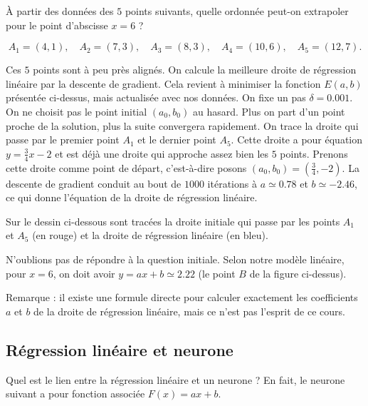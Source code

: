 \documentclass[11pt,class=report,crop=false]{standalone}
\begin{document}
\begin{exemple}
\`A partir des données des $5$ points suivants, quelle ordonnée peut-on extrapoler pour le point d'abscisse $x=6$ ?

$$A_1 = (4,1),\quad A_2 = (7,3),\quad A_3 = (8,3),\quad A_4 = (10,6),\quad A_5 = (12,7).$$

Ces $5$ points sont à peu près alignés. On calcule la meilleure droite de régression linéaire par la descente de gradient. Cela revient à minimiser la fonction $E(a,b)$ présentée ci-dessus, mais actualisée avec nos données. 
On fixe un pas $\delta = 0.001$.
On ne choisit pas le point initial $(a_0,b_0)$ au hasard. Plus on part d'un point proche de la solution, plus la suite convergera rapidement. On trace la droite qui passe par le premier point $A_1$ et le dernier point $A_5$. Cette droite a pour équation $y=\frac34 x -2$ et est déjà une droite qui approche assez bien les $5$ points. Prenons cette droite comme point de départ, c'est-à-dire posons $(a_0,b_0) = (\frac34,-2)$.
La descente de gradient conduit au bout de $1000$ itérations à $a\simeq 0.78$ et $b\simeq -2.46$,
ce qui donne l'équation de la droite de régression linéaire.

Sur le dessin ci-dessous sont tracées la droite initiale qui passe par les points $A_1$ et $A_5$ (en rouge) et la droite de régression linéaire (en bleu).


N'oublions pas de répondre à la question initiale. Selon notre modèle linéaire, pour $x=6$, on doit avoir $y=ax+b \simeq 2.22$ (le point $B$ de la figure ci-dessus).
\end{exemple}

Remarque : il existe une formule directe pour calculer exactement les coefficients $a$ et $b$ de la droite de régression linéaire, mais ce n'est pas l'esprit de ce cours.


\subsection{Régression linéaire et neurone}

Quel est le lien entre la régression linéaire et un neurone ?
En fait, le neurone suivant a pour fonction associée $F(x) = ax+b$.

\end{document}
